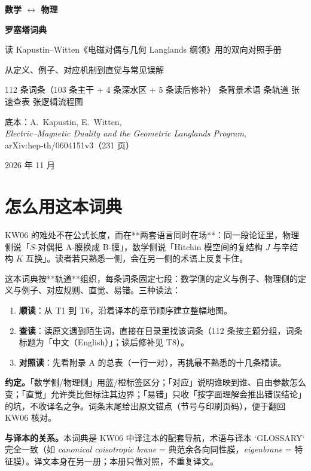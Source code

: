 \begin{titlepage}
\centering
\vspace*{2.2cm}
{\Huge\bfseries 数学 $\leftrightarrow$ 物理\par}
\vspace{0.4cm}
{\Huge\bfseries 罗塞塔词典\par}
\vspace{1.0cm}
{\Large 读 Kapustin--Witten《电磁对偶与几何 Langlands 纲领》用的双向对照手册\par}
\vspace{1.6cm}
{\large 从定义、例子、对应机制到直觉与常见误解\par}
\vspace{0.5cm}
{\large 112 条词条（103 条主干 + 4 条深水区 + 5 条读后修补）  条背景术语  条轨道  张速查表  张逻辑流程图\par}
\vspace{2.4cm}
{\large 底本：A.~Kapustin, E.~Witten,\\
\emph{Electric--Magnetic Duality and the Geometric Langlands Program},\\
arXiv:hep-th/0604151v3（231 页）\par}
\vfill
{\large 2026 年 11 月\par}
\end{titlepage}

\section*{怎么用这本词典}

KW06 的难处不在公式长度，而在**两套语言同时在场**：同一段论证里，物理侧说「$S$-对偶把 A-膜换成 B-膜」，数学侧说「Hitchin 模空间的复结构 $J$ 与辛结构 $K$ 互换」。读者若只熟悉一侧，会在另一侧的术语上反复卡住。

这本词典按**轨道**组织，每条词条固定七段：数学侧的定义与例子、物理侧的定义与例子、对应规则、直觉、易错。三种读法：

\begin{enumerate}[leftmargin=2em,itemsep=3pt]
  \item \textbf{顺读}：从 T1 到 T6，沿着译本的章节顺序建立整幅地图。
  \item \textbf{查读}：读原文遇到陌生词，直接在目录里找该词条（112 条按主题分组，词条标题为「中文（English）」；读后修补见 T8）。
  \item \textbf{对照读}：先看附录 A 的总表（一行一对），再挑最不熟悉的十几条精读。
\end{enumerate}

\textbf{约定。}「数学侧/物理侧」用蓝/橙标签区分；「对应」说明谁映到谁、自由参数怎么变；「直觉」允许类比但标注其边界；「易错」只收「按字面理解会推出错误结论」的坑，不收译名之争。词条末尾给出原文锚点（节号与印刷页码），便于翻回 KW06 核对。

\textbf{与译本的关系。}本词典是 KW06 中译注本的配套导航，术语与译本 `GLOSSARY` 完全一致（如 \emph{canonical coisotropic brane} = 典范余各向同性膜，\emph{eigenbrane} = 特征膜）。译文本身在另一册；本册只做对照，不重复译文。

\medskip
{}
\clearpage
